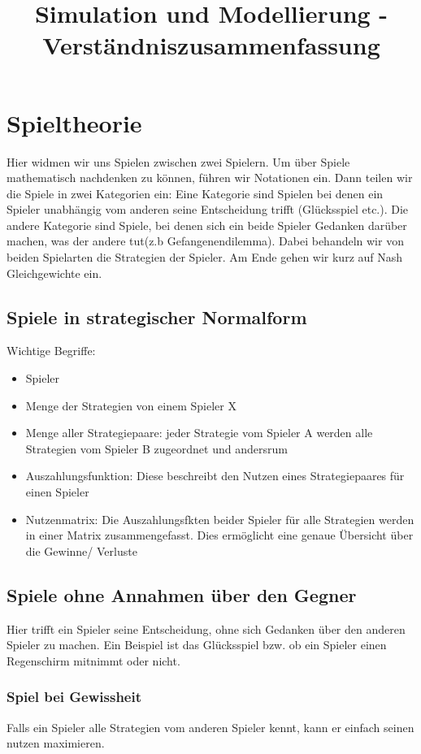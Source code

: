 \documentclass[]{article}
\title{Simulation und Modellierung - Verständniszusammenfassung}
\author{}
\begin{document}
\maketitle

\section{Spieltheorie}
Hier widmen wir uns Spielen zwischen zwei Spielern. Um über Spiele mathematisch nachdenken zu können, führen wir Notationen ein. Dann teilen wir die Spiele in zwei Kategorien ein: Eine Kategorie sind Spielen bei denen ein Spieler unabhängig vom anderen seine Entscheidung trifft (Glücksspiel etc.). Die andere Kategorie sind Spiele, bei denen sich ein beide Spieler Gedanken darüber machen, was der andere tut(z.b Gefangenendilemma). Dabei behandeln wir von beiden Spielarten die Strategien der Spieler. Am Ende gehen wir kurz auf Nash Gleichgewichte ein. 

\subsection{Spiele in strategischer Normalform}
Wichtige Begriffe:
\begin{itemize}
	\item Spieler
	\item Menge der Strategien von einem Spieler X
	\item Menge aller Strategiepaare: jeder Strategie vom Spieler A werden alle Strategien vom Spieler B zugeordnet und andersrum
	\item Auszahlungsfunktion: Diese beschreibt den Nutzen eines Strategiepaares für einen Spieler
	\item Nutzenmatrix: Die Auszahlungsfkten beider Spieler für alle Strategien werden in einer Matrix zusammengefasst. Dies ermöglicht eine genaue Übersicht über die Gewinne/ Verluste  
\end{itemize}

\subsection{Spiele ohne Annahmen über den Gegner}
Hier trifft ein Spieler seine Entscheidung, ohne sich Gedanken über den anderen Spieler zu machen. Ein Beispiel ist das Glücksspiel bzw. ob ein Spieler einen Regenschirm mitnimmt oder nicht. 

\subsubsection{Spiel bei Gewissheit}
Falls ein Spieler alle Strategien vom anderen Spieler kennt, kann er einfach seinen nutzen maximieren. 
\end{document}
